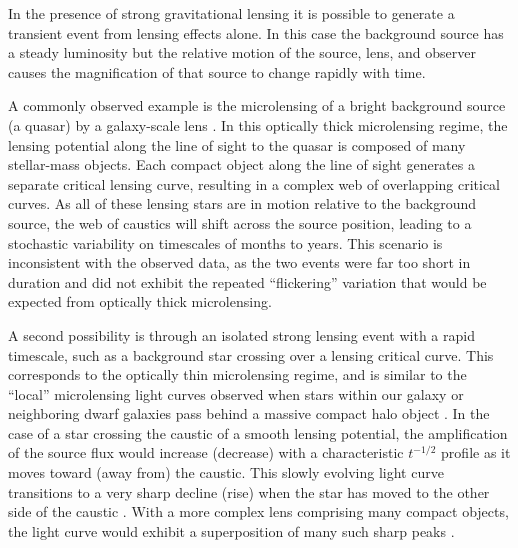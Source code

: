 In the presence of strong gravitational lensing it is possible to
generate a transient event from lensing effects alone.  In this case
the background source has a steady luminosity but the relative motion
of the source, lens, and observer causes the magnification of that
source to change rapidly with time.

A commonly observed example is the microlensing of a bright background
source (a quasar) by a galaxy-scale lens \citep{Wambsganss:2001,
  Kochanek:2004}.  In this optically thick microlensing regime, the
lensing potential along the line of sight to the quasar is composed of
many stellar-mass objects.  Each compact object along the line of
sight generates a separate critical lensing curve, resulting in a
complex web of overlapping critical curves. As all of these lensing
stars are in motion relative to the background source, the web of
caustics will shift across the source position, leading to a
stochastic variability on timescales of months to years.  This
scenario is inconsistent with the observed data, as the two \spock
events were far too short in duration and did not exhibit the repeated
``flickering'' variation that would be expected from optically thick
microlensing.

A second possibility is through an isolated strong lensing event with
a rapid timescale, such as a background star crossing over a lensing
critical curve.  This corresponds to the optically thin microlensing
regime, and is similar to the ``local'' microlensing light curves
observed when stars within our galaxy or neighboring dwarf galaxies
pass behind a massive compact halo object \citep{Paczynski:1986,
  Alcock:1993, Aubourg:1993, Udalski:1993}.  In the case of a star
crossing the caustic of a smooth lensing potential, the amplification
of the source flux would increase (decrease) with a characteristic
$t^{-1/2}$ profile as it moves toward (away from) the caustic. This
slowly evolving light curve transitions to a very sharp decline (rise)
when the star has moved to the other side of the caustic
\citep{Schneider:1986,MiraldaEscude:1991}.  With a more complex lens
comprising many compact objects, the light curve would exhibit a
superposition of many such sharp peaks \citep{Lewis:1993}.

